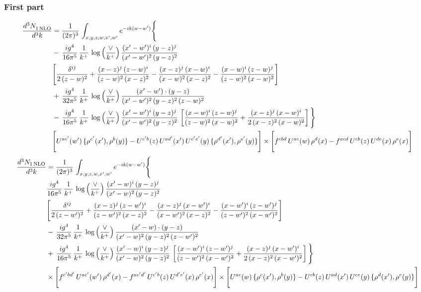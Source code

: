 \documentclass[9pt]{article}
\numberwithin{equation}{section}
\begin{document}
\subsubsection{First part}
\begin{align}
 \frac{d^{3}N_{1\,\rm NLO}^{\rm}}{d^{3}k}  & =     \frac{1}{(2\pi)^{3}}\,\int_{x,y,z,w,x',w^{\prime}} e^{-ik(w-w^{\prime})}\Bigg\{\notag \\
& -\, \frac{ig^{4}}{16\pi^{5}}\,\frac{1}{k^{+}}\,\log{\left(\frac{\vee}{k^{+}}\right)}\, \frac{(x'-w')^{i}\,(y-z)^{j}}{(x'-w')^{2}\,(y-z)^{2}}\notag \\ &  \Bigg[\frac{\delta^{ij}}{2\,(z-w)^{2}}+\frac{(x-z)^{j}\,(z-w)^{i}}{(z-w)^{2}\,(x-z)^{2}}-\frac{(x-z)^{j}\,(x-w)^{i}}{(x-w)^{2}\,(x-z)^{2}}-\frac{(x-w)^{i}\,(z-w)^{j}}{(z-w)^{2}\,(x-w)^{2}}\Bigg] \notag \\
& +\,\frac{ig^{4}}{32\pi^{5}}\,\frac{1}{k^{+}}\,\log{\left(\frac{\vee}{k^{+}}\right)}\, \frac{(x'-w')\cdot (y-z)}{(x'-w')^{2}\,(y-z)^{2}\,(z-w)^{2}} \notag \\
& -\, \frac{ig^{4}}{16\pi^{5}}\,\frac{1}{k^{+}}\,\log{\left(\frac{\vee}{k^{+}}\right)}\,\frac{(x'-w')^{i}\,(y-z)^{j}}{(x'-w')^{2}\,(y-z)^{2}}\,\left[\frac{(x-w)^{i}\,(z-w)^{j}}{(z-w)^{2}\,(x-w)^{2}}+\frac{(x-z)^{j}\,(x-w)^{i}}{2\,(x-z)^{2}\, (x-w)^{2}}\right]\Bigg\} \notag \\ & \Bigg[U^{ac'}(w')\,\{\rho^{c'}(x'),\rho^{b}(y)\}-U^{c'b}(z)\,U^{ad'}(x')\,U^{c'e'}(y)\, \{\rho^{d'}(x'),\rho^{e'}(y)\}\Bigg]\times \Bigg[f^{cbd}\,U^{ac}(w)\,\rho^{d}(x)-f^{acd}\, U^{cb}(z)\,U^{de}(x)\,\rho^{e}(x)\Bigg]
\end{align}
\begin{align}
\frac{d^{3}N_{1\,\rm NLO}}{d^{3}k} & =  \frac{1}{(2\pi)^{3}}\,\int_{x,y,z,w,x',w^{\prime}} e^{-ik(w-w^{\prime})}\Bigg\{\notag \\
&  \frac{ig^{4}}{16\pi^{5}}\,\frac{1}{k^{+}}\,\log{\left(\frac{\vee}{k^{+}}\right)}\, \frac{(x'-w)^{i}\,(y-z)^{j}}{(x'-w)^{2}\,(y-z)^{2}}\notag \\ &  \Bigg[\frac{\delta^{ij}}{2\,(z-w')^{2}}+\frac{(x-z)^{j}\,(z-w')^{i}}{(z-w')^{2}\,(x-z)^{2}}-\frac{(x-z)^{j}\,(x-w')^{i}}{(x-w')^{2}\,(x-z)^{2}}-\frac{(x-w')^{i}\,(z-w')^{j}}{(z-w')^{2}\,(x-w')^{2}}\Bigg] \notag \\
& -\,\frac{ig^{4}}{32\pi^{5}}\,\frac{1}{k^{+}}\,\log{\left(\frac{\vee}{k^{+}}\right)}\, \frac{(x'-w)\cdot (y-z)}{(x'-w)^{2}\,(y-z)^{2}\,(z-w')^{2}} \notag \\
& +\,\frac{ig^{4}}{16\pi^{5}}\,\frac{1}{k^{+}}\,\log{\left(\frac{\vee}{k^{+}}\right)}\,\frac{(x'-w)^{i}\,(y-z)^{j}}{(x'-w)^{2}\,(y-z)^{2}}\,\left[\frac{(x-w')^{i}\,(z-w')^{j}}{(z-w')^{2}\,(x-w')^{2}}+\frac{(x-z)^{j}\,(x-w')^{i}}{2\,(x-z)^{2}\, (x-w')^{2}}\right]\Bigg\} \notag \\ & \times\Bigg[f^{c'bd'}\,U^{ac'}(w')\,\rho^{d'}(x)-f^{ac'd'}\, U^{c'b}(z)\,U^{d'e'}(x)\,\rho^{e'}(x)\Bigg] \times \Bigg[U^{ac}(w)\,\{\rho^{c}(x'),\rho^{b}(y)\}-U^{cb}(z)\,U^{ad}(x')\,U^{ce}(y)\, \{\rho^{d}(x'),\rho^{e}(y)\}\Bigg]
\end{align}
\end{document}
